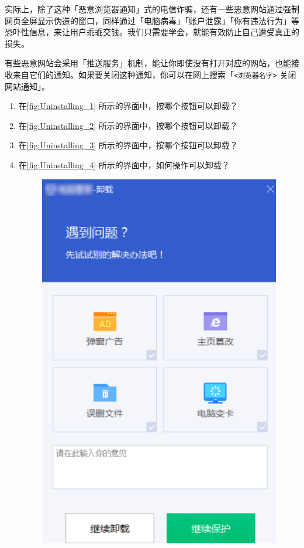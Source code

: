 实际上，除了这种「恶意浏览器通知」式的电信诈骗，还有一些恶意网站通过强制网页全屏显示伪造的窗口，同样通过「电脑病毒」「账户泄露」「你有违法行为」等恐吓性信息，来让用户乖乖交钱。我们只需要学会，就能有效防止自己遭受真正的损失。

\begin{note}
  有些恶意网站会采用「推送服务」机制，能让你即使没有打开对应的网站，也能接收来自它们的通知。如果要关闭这种通知，你可以在网上搜索「\texttt{<浏览器名字>} 关闭网站通知」。
\end{note}

\practice

\begin{enumerate}
  \item 在\autoref{fig:Uninstalling_1} 所示的界面中，按哪个按钮可以卸载？
  \item 在\autoref{fig:Uninstalling_2} 所示的界面中，按哪个按钮可以卸载？
  \item 在\autoref{fig:Uninstalling_3} 所示的界面中，按哪个按钮可以卸载？
  \item 在\autoref{fig:Uninstalling_4} 所示的界面中，如何操作可以卸载？
    \begin{figure}[htb!]
      \centering
      \begin{minipage}{.44\textwidth}
        \centering
        \includegraphics[width=.8\textwidth]{assets/basic/Uninstalling_1.png}

\end{minipage}
\end{figure}
\end{enumerate}

